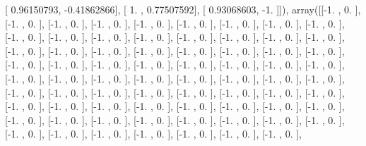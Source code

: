 \documentclass{article}
\begin{document}
       [ 0.96150793, -0.41862866],
       [ 1.        ,  0.77507592],
       [ 0.93068603, -1.        ]]), array([[-1.        ,  0.        ],
       [-1.        ,  0.        ],
       [-1.        ,  0.        ],
       [-1.        ,  0.        ],
       [-1.        ,  0.        ],
       [-1.        ,  0.        ],
       [-1.        ,  0.        ],
       [-1.        ,  0.        ],
       [-1.        ,  0.        ],
       [-1.        ,  0.        ],
       [-1.        ,  0.        ],
       [-1.        ,  0.        ],
       [-1.        ,  0.        ],
       [-1.        ,  0.        ],
       [-1.        ,  0.        ],
       [-1.        ,  0.        ],
       [-1.        ,  0.        ],
       [-1.        ,  0.        ],
       [-1.        ,  0.        ],
       [-1.        ,  0.        ],
       [-1.        ,  0.        ],
       [-1.        ,  0.        ],
       [-1.        ,  0.        ],
       [-1.        ,  0.        ],
       [-1.        ,  0.        ],
       [-1.        ,  0.        ],
       [-1.        ,  0.        ],
       [-1.        ,  0.        ],
       [-1.        ,  0.        ],
       [-1.        ,  0.        ],
       [-1.        ,  0.        ],
       [-1.        ,  0.        ],
       [-1.        ,  0.        ],
       [-1.        ,  0.        ],
       [-1.        ,  0.        ],
       [-1.        ,  0.        ],
       [-1.        ,  0.        ],
       [-1.        ,  0.        ],
       [-1.        ,  0.        ],
       [-1.        ,  0.        ],
       [-1.        ,  0.        ],
       [-1.        ,  0.        ],
       [-1.        ,  0.        ],
       [-1.        ,  0.        ],
       [-1.        ,  0.        ],
       [-1.        ,  0.        ],
       [-1.        ,  0.        ],
       [-1.        ,  0.        ],
       [-1.        ,  0.        ],
       [-1.        ,  0.        ],
       [-1.        ,  0.        ],
       [-1.        ,  0.        ],
       [-1.        ,  0.        ],
       [-1.        ,  0.        ],
       [-1.        ,  0.        ],
       [-1.        ,  0.        ],
       [-1.        ,  0.        ],
       [-1.        ,  0.        ],
       [-1.        ,  0.        ],
       [-1.        ,  0.        ],
       [-1.        ,  0.        ],
       [-1.        ,  0.        ],
       [-1.        ,  0.        ],
       [-1.        ,  0.        ],
       [-1.        ,  0.        ],
       [-1.        ,  0.        ],
       [-1.        ,  0.        ],
       [-1.        ,  0.        ],
       [-1.        ,  0.        ],
       [-1.        ,  0.        ],
       [-1.        ,  0.        ],
       [-1.        ,  0.        ],
\end{document}
